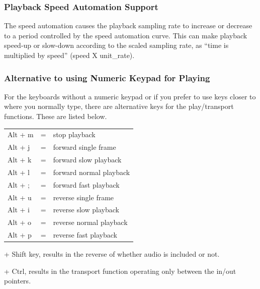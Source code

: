 \subsubsection*{Playback Speed Automation Support}%
\label{ssub:playback_speed_automation_support}


The speed automation causes the playback sampling rate to increase or decrease to a period controlled by the speed automation curve.  
This can make playback speed-up or slow-down according to the scaled sampling rate, as “time is multiplied by speed” (speed X unit\_rate).

\subsubsection*{Alternative to using Numeric Keypad for Playing}%
\label{ssub:alternative_to_using_numeric_keypad_for_playing}


For the keyboards without a numeric keypad or if you prefer to use keys closer to where you normally type, there are alternative keys for the play/transport functions.  These are listed below.

\begin{tabular}{lcl}
	Alt + m&=&stop playback\\

	Alt + j&=&forward single frame\\

	Alt + k&=&forward slow playback\\

	Alt + l&=&forward normal playback\\

	Alt + ;&=&forward fast playback\\

	Alt + u&=&reverse single frame\\

	Alt + i&=&reverse slow playback\\

	Alt + o&=&reverse normal playback\\

	Alt + p&=&reverse fast playback\\
\end{tabular}
\begin{minipage}{.45\linewidth}
+ Shift key, results in the reverse of whether audio is included or not.
\vspace{1ex}

+ Ctrl, results in the transport function operating only between the in/out pointers.
\end{minipage}

